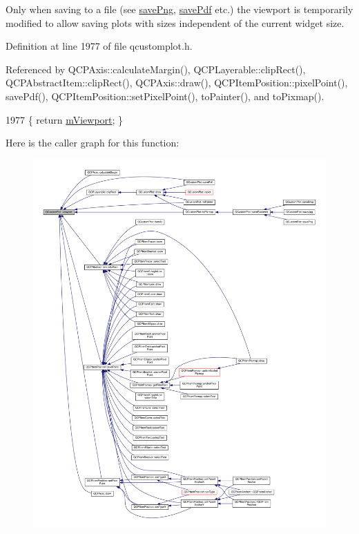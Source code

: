 Only when saving to a file (see \hyperlink{class_q_custom_plot_a7636261aff1f6d25c9da749ece3fc8b8}{save\+Png}, \hyperlink{class_q_custom_plot_a632da44c6d94ea8b271eb483b08b5114}{save\+Pdf} etc.) the viewport is temporarily modified to allow saving plots with sizes independent of the current widget size. 

Definition at line 1977 of file qcustomplot.\+h.



Referenced by Q\+C\+P\+Axis\+::calculate\+Margin(), Q\+C\+P\+Layerable\+::clip\+Rect(), Q\+C\+P\+Abstract\+Item\+::clip\+Rect(), Q\+C\+P\+Axis\+::draw(), Q\+C\+P\+Item\+Position\+::pixel\+Point(), save\+Pdf(), Q\+C\+P\+Item\+Position\+::set\+Pixel\+Point(), to\+Painter(), and to\+Pixmap().


\begin{DoxyCode}
1977 \{ \textcolor{keywordflow}{return} \hyperlink{class_q_custom_plot_ac0a7c38a715526c257cff95774f83ab6}{mViewport}; \}
\end{DoxyCode}


Here is the caller graph for this function\+:\nopagebreak
\begin{figure}[H]
\begin{center}
\leavevmode
\includegraphics[width=350pt]{class_q_custom_plot_a953ecdbc28018e7e84cb6213ad3d88c2_icgraph}
\end{center}
\end{figure}


